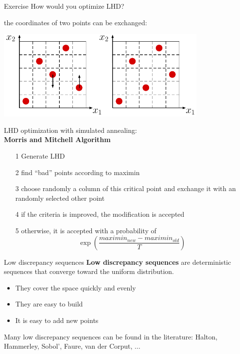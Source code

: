 \documentclass{beamer}
\begin{document}
\begin{frame}{}
\begin{exampleblock}{Exercise}
How would you optimize LHD?
\end{exampleblock}
\pause
the coordinates of two points can be exchanged:\\
\vspace{4mm}
\begin{center}
\includegraphics[height=4.5cm]{figures/latexdraw/lhs3}
\end{center}
\end{frame}

\begin{frame}{}
LHD optimization with simulated annealing:\\
\vspace{4mm}
\textbf{Morris and Mitchell Algorithm}\\
\vspace{2mm}
\begin{itemize}
	\item[1] Generate LHD
	\item[2] find ``bad'' points according to maximin
	\item[3] choose randomly a column of this critical point and exchange it with an randomly selected other point
	\item[4] \qquad if the criteria is improved, the modification is accepted
	\item[5] \qquad otherwise, it is accepted with a probability of $$\exp \left(\frac{maximin_{new}-maximin_{old}}{T}\right)$$
	\end{itemize}
\end{frame}



\begin{frame}{Low discrepancy sequences}
\textbf{Low discrepancy sequences} are deterministic sequences that converge toward the uniform distribution. 
\begin{itemize}
	\item They cover the space quickly and evenly
	\item They are easy to build
	\item It is easy to add new points
\end{itemize}
\vspace{5mm}
Many low discrepancy sequences can be found in the literature: Halton, Hammerley, Sobol', Faure, van der Corput, ...
\end{frame}
\end{document}
